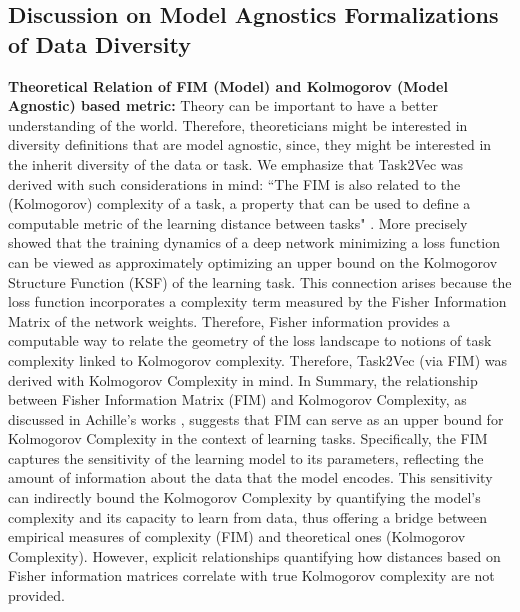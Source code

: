 \documentclass[10pt]{article} %
\begin{document}
\subsection{Discussion on Model Agnostics Formalizations of Data Diversity}\label{kolmogorov_fisher_relation}
\textbf{Theoretical Relation of FIM (Model) and Kolmogorov (Model Agnostic) based metric: } 
Theory can be important to have a better understanding of the world. 
Therefore, theoreticians might be interested in diversity definitions that are model agnostic, since, they might be interested in the inherit diversity of the data or task. 
We emphasize that Task2Vec was derived with such considerations in mind: 
``The FIM is also related to the (Kolmogorov) complexity of a task, a property that can be used to define a computable metric of the learning distance between tasks" \citep{task2vec}.
More precisely \citep{AchilleMbengSoatto2018} showed that the training dynamics of a deep network minimizing a loss function can be viewed as approximately optimizing an upper bound on the Kolmogorov Structure Function (KSF) of the learning task. 
This connection arises because the loss function incorporates a complexity term measured by the Fisher Information Matrix of the network weights. 
Therefore, Fisher information provides a computable way to relate the geometry of the loss landscape to notions of task complexity linked to Kolmogorov complexity. 
Therefore, Task2Vec (via FIM) was derived with Kolmogorov Complexity in mind. 
In Summary, the relationship between Fisher Information Matrix (FIM) and Kolmogorov Complexity, as discussed in Achille's works \citep{task2vec, AchilleMbengSoatto2018, achille2019dynamics, AchillePaoliniMbengSoatto2021}, suggests that FIM can serve as an upper bound for Kolmogorov Complexity in the context of learning tasks. 
Specifically, the FIM captures the sensitivity of the learning model to its parameters, reflecting the amount of information about the data that the model encodes. 
This sensitivity can indirectly bound the Kolmogorov Complexity by quantifying the model's complexity and its capacity to learn from data, thus offering a bridge between empirical measures of complexity (FIM) and theoretical ones (Kolmogorov Complexity).
However, explicit relationships quantifying how distances based on Fisher information matrices correlate with true Kolmogorov complexity are not provided.
\end{document}
